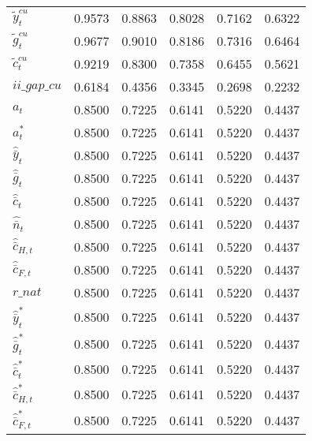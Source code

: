 \begin{center}
\begin{longtable}{lccccc}
${\tilde y_t^{cu}}        $	 & 	    0.9573	 & 	    0.8863	 & 	    0.8028	 & 	    0.7162	 & 	    0.6322 \\ 
${\tilde g_t^{cu}}        $	 & 	    0.9677	 & 	    0.9010	 & 	    0.8186	 & 	    0.7316	 & 	    0.6464 \\ 
${\tilde c_t^{cu}}        $	 & 	    0.9219	 & 	    0.8300	 & 	    0.7358	 & 	    0.6455	 & 	    0.5621 \\ 
$ii\_gap\_cu              $	 & 	    0.6184	 & 	    0.4356	 & 	    0.3345	 & 	    0.2698	 & 	    0.2232 \\ 
${a_t}                    $	 & 	    0.8500	 & 	    0.7225	 & 	    0.6141	 & 	    0.5220	 & 	    0.4437 \\ 
${a_t^*}                  $	 & 	    0.8500	 & 	    0.7225	 & 	    0.6141	 & 	    0.5220	 & 	    0.4437 \\ 
${\hat {\bar y}_t}        $	 & 	    0.8500	 & 	    0.7225	 & 	    0.6141	 & 	    0.5220	 & 	    0.4437 \\ 
${\hat {\bar g}_t}        $	 & 	    0.8500	 & 	    0.7225	 & 	    0.6141	 & 	    0.5220	 & 	    0.4437 \\ 
${\hat {\bar c}_t}        $	 & 	    0.8500	 & 	    0.7225	 & 	    0.6141	 & 	    0.5220	 & 	    0.4437 \\ 
${\hat {\bar n}_t}        $	 & 	    0.8500	 & 	    0.7225	 & 	    0.6141	 & 	    0.5220	 & 	    0.4437 \\ 
${\hat {\bar c}_{H,t}}    $	 & 	    0.8500	 & 	    0.7225	 & 	    0.6141	 & 	    0.5220	 & 	    0.4437 \\ 
${\hat {\bar c}_{F,t}}    $	 & 	    0.8500	 & 	    0.7225	 & 	    0.6141	 & 	    0.5220	 & 	    0.4437 \\ 
$r\_nat                   $	 & 	    0.8500	 & 	    0.7225	 & 	    0.6141	 & 	    0.5220	 & 	    0.4437 \\ 
${\hat {\bar y}_t^*}      $	 & 	    0.8500	 & 	    0.7225	 & 	    0.6141	 & 	    0.5220	 & 	    0.4437 \\ 
${\hat {\bar g}_t^*}      $	 & 	    0.8500	 & 	    0.7225	 & 	    0.6141	 & 	    0.5220	 & 	    0.4437 \\ 
${\hat {\bar c}_t^*}      $	 & 	    0.8500	 & 	    0.7225	 & 	    0.6141	 & 	    0.5220	 & 	    0.4437 \\ 
${\hat {\bar c}_{H,t}^*}  $	 & 	    0.8500	 & 	    0.7225	 & 	    0.6141	 & 	    0.5220	 & 	    0.4437 \\ 
${\hat {\bar c}_{F,t}^*}  $	 & 	    0.8500	 & 	    0.7225	 & 	    0.6141	 & 	    0.5220	 & 	    0.4437 \\ 

\end{longtable}
\end{center}
